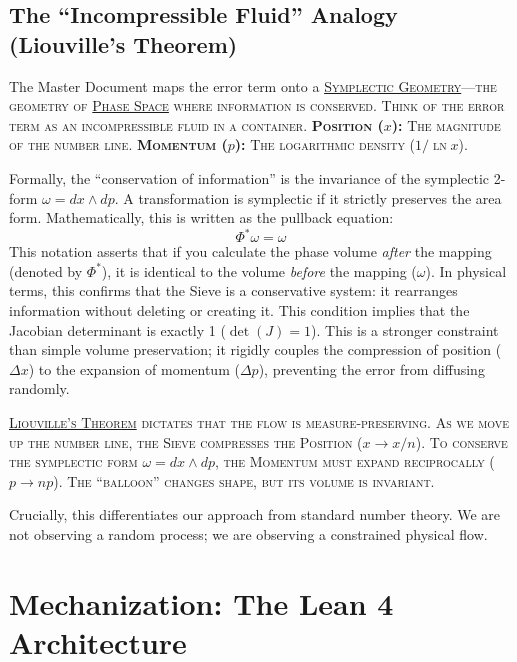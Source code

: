 \documentclass[sn-mathphys-num, pdflatex]{sn-jnl}
\newcommand{\gterm}[2]{\begingroup\normalfont\scshape\hyperlink{#1}{#2}\endgroup}
\begin{document}
\subsection{The ``Incompressible Fluid'' Analogy (Liouville's Theorem)}
The Master Document maps the error term onto a \gterm{geometry}{Symplectic Geometry}---the geometry of \gterm{phase_space}{Phase Space} where information is conserved.
Think of the error term as an incompressible fluid in a container. \textbf{Position ($x$):} The magnitude of the number line.  \textbf{Momentum ($p$):} The logarithmic density ($1/\ln x$).


\begin{sidebar}[frametitle={Technical Insight: The Symplectic Form}]
Formally, the ``conservation of information'' is the invariance of the symplectic 2-form $\omega = dx \wedge dp$. 
A transformation is symplectic if it strictly preserves the area form. Mathematically, this is written as the pullback equation:
\begin{equation}
\Phi^*\omega = \omega
\end{equation}
This notation asserts that if you calculate the phase volume \textit{after} the mapping (denoted by $\Phi^*$), it is identical to the volume \textit{before} the mapping ($\omega$). In physical terms, this confirms that the Sieve is a conservative system: it rearranges information without deleting or creating it. This condition implies that the Jacobian determinant is exactly 1 ($\det(J)=1$). This is a stronger constraint than simple volume preservation; it rigidly couples the compression of position ($\Delta x$) to the expansion of momentum ($\Delta p$), preventing the error from diffusing randomly.
\end{sidebar}

\gterm{liouville}{Liouville's Theorem} dictates that the flow is measure-preserving. As we move up the number line, the Sieve compresses the Position ($x \to x/n$). To conserve the symplectic form $\omega = dx \wedge dp$, the Momentum must expand reciprocally ($p \to np$). The ``balloon'' changes shape, but its volume is invariant.

Crucially, this differentiates our approach from standard number theory. We are not observing a random process; we are observing a constrained physical flow.

\section{Mechanization: The Lean 4 Architecture}
\end{document}
